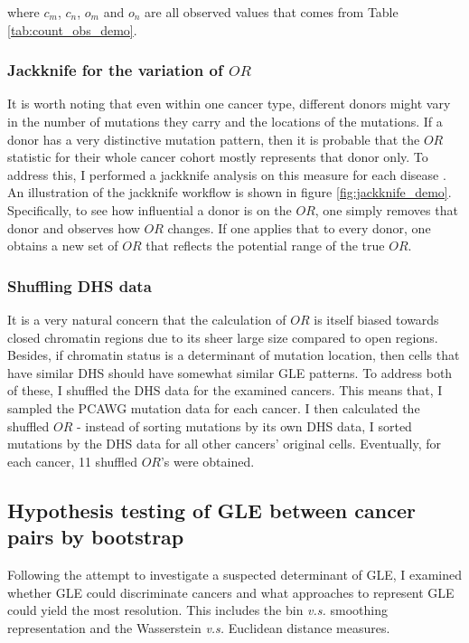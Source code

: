 where $c_m$, $c_n$, $o_m$ and $o_n$ are all observed values that comes from Table \ref{tab:count_obs_demo}.

\subsubsection{Jackknife for the variation of $OR$}
It is worth noting that even within one cancer type, different donors might vary in the number of mutations they carry and the locations of the mutations. If a donor has a very distinctive mutation pattern, then it is probable that the $OR$ statistic for their whole cancer cohort mostly represents that donor only. To address this, I performed a jackknife analysis on this measure for each disease \citep{Miller1974TheReview}. An illustration of the jackknife workflow is shown in figure \ref{fig:jackknife_demo}. Specifically, to see how influential a donor is on the $OR$, one simply removes that donor and observes how $OR$ changes. If one applies that to every donor, one obtains a new set of $OR$ that reflects the potential range of the true $OR$.



\subsubsection{Shuffling DHS data}
It is a very natural concern that the calculation of $OR$ is itself biased towards closed chromatin regions due to its sheer large size compared to open regions. Besides, if chromatin status is a determinant of mutation location, then cells that have similar DHS should have somewhat similar GLE patterns. To address both of these, I shuffled the DHS data for the examined cancers. This means that, I sampled the PCAWG mutation data for each cancer. I then calculated the shuffled $OR$ - instead of sorting mutations by its own DHS data, I sorted mutations by the DHS data for all other cancers' original cells. Eventually, for each cancer, 11 shuffled $OR$'s were obtained. 

\subsection{Hypothesis testing of GLE between cancer pairs by bootstrap}\label{methods:bootstrap}

Following the attempt to investigate a suspected determinant of GLE, I examined whether GLE could discriminate cancers and what approaches to represent GLE could yield the most resolution. This includes the bin \textit{v.s.} smoothing representation and the Wasserstein \textit{v.s.} Euclidean distance measures. 

